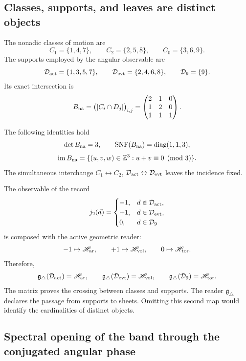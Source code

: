 \subsection{Classes, supports, and leaves are distinct objects}

The nonadic classes of motion are
\[
 C_1=\{1,4,7\},\qquad C_2=\{2,5,8\},\qquad C_0=\{3,6,9\}.
\]
The supports employed by the angular observable are
\[
 \mathcal D_{\rm act}=\{1,3,5,7\},\qquad
 \mathcal D_{\rm evt}=\{2,4,6,8\},\qquad
 \mathcal D_9=\{9\}.
\]
Its exact intersection is
\[
 B_{\rm na}=\bigl(|C_i\cap D_j|\bigr)_{i,j}
 =\begin{pmatrix}2&1&0\\1&2&0\\1&1&1\end{pmatrix}.
\]

\begin{theorem}
\label{p12-83-c16-s3:thm:incidencia-triadica-corta}
The following identities hold
\[
 \det B_{\rm na}=3,
 \qquad
 \operatorname{SNF}(B_{\rm na})=\operatorname{diag}(1,1,3),
\]
\[
 \operatorname{im}B_{\rm na}
 =\{(u,v,w)\in\mathbb Z^3:u+v\equiv0\pmod3\}.
\]
The simultaneous interchange
\(C_1\leftrightarrow C_2\),
\(\mathcal D_{\rm act}\leftrightarrow\mathcal D_{\rm evt}\) leaves the
incidence fixed.
\end{theorem}

The observable of the record
\[
 j_2(d)=
 \begin{cases}
 -1,&d\in\mathcal D_{\rm act},\\
 +1,&d\in\mathcal D_{\rm evt},\\
 0,&d\in\mathcal D_9
 \end{cases}
\]
is composed with the active geometric reader:
\[
 -1\mapsto\mathscr H_{\rm ar},\qquad
 +1\mapsto\mathscr H_{\rm vol},\qquad
 0\mapsto\mathscr H_{\rm tor}.
\]
Therefore,
\[
 \mathfrak g_\triangle(\mathcal D_{\rm act})=\mathscr H_{\rm ar},\qquad
 \mathfrak g_\triangle(\mathcal D_{\rm evt})=\mathscr H_{\rm vol},\qquad
 \mathfrak g_\triangle(\mathcal D_9)=\mathscr H_{\rm tor}.
\]
The matrix proves the crossing between classes and supports. The reader
\(\mathfrak g_\triangle\) declares the passage from supports to sheets. Omitting this
second map would identify the cardinalities of distinct objects.

\subsection{Spectral opening of the band through the conjugated angular phase}

